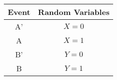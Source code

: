  {
	\begin{tabular}{|c|c|}
		\hline
		\textbf{Event}&\textbf{Random Variables}\\
		\hline
		 A' & $X=0$\\
		\hline
		 A & $X=1$\\
		\hline
		 B' & $Y=0$\\
		\hline
		 B & $Y=1$\\
		\hline
	\end{tabular}
}